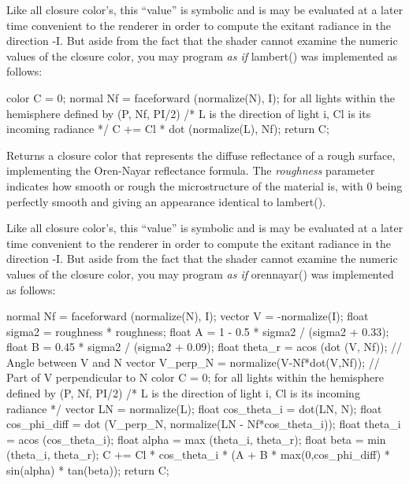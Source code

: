 \documentclass[11pt,letterpaper]{book}
\def\colorclosure{{\cf closure color}\xspace}
\begin{document}
Like all \colorclosure's, this ``value'' is symbolic and is may be
evaluated at a later time convenient to the renderer in order to compute
the exitant radiance in the direction {\cf -I}.  But aside from the
fact that the shader cannot examine the numeric values of the
\colorclosure, you may program \emph{as if} {\cf lambert()} was
implemented as follows:

\begin{code}
    color C = 0;
    normal Nf = faceforward (normalize(N), I);
    for all lights within the hemisphere defined by (P, Nf, PI/2) {
        /* L is the direction of light i, Cl is its incoming radiance */
        C += Cl * dot (normalize(L), Nf);
    }
    return C;
\end{code}
\apiend

\apiitem{\colorclosure\ {\ce orennayar} (float roughness)}

Returns a \colorclosure that represents the diffuse reflectance of a
rough surface, implementing the Oren-Nayar reflectance formula.  The
\emph{roughness} parameter indicates how smooth or rough the
microstructure of the material is, with 0 being perfectly smooth and
giving an appearance identical to {\cf lambert()}.

Like all \colorclosure's, this ``value'' is symbolic and is may be
evaluated at a later time convenient to the renderer in order to compute
the exitant radiance in the direction {\cf -I}.  But aside from the
fact that the shader cannot examine the numeric values of the
\colorclosure, you may program \emph{as if} {\cf orennayar()} was
implemented as follows:

\begin{code}
    normal Nf = faceforward (normalize(N), I);
    vector V = -normalize(I);
    float sigma2 = roughness * roughness;
    float A = 1 - 0.5 * sigma2 / (sigma2 + 0.33);
    float B = 0.45 * sigma2 / (sigma2 + 0.09);
    float  theta_r = acos (dot (V, Nf));         // Angle between V and N
    vector V_perp_N = normalize(V-Nf*dot(V,Nf)); // Part of V perpendicular to N
    color C = 0;
    for all lights within the hemisphere defined by (P, Nf, PI/2) {
        /* L is the direction of light i, Cl is its incoming radiance */
        vector LN = normalize(L);
        float cos_theta_i = dot(LN, N);
        float cos_phi_diff = dot (V_perp_N, normalize(LN - Nf*cos_theta_i));
        float theta_i = acos (cos_theta_i);
        float alpha = max (theta_i, theta_r);
        float beta = min (theta_i, theta_r);
        C += Cl * cos_theta_i * 
                (A + B * max(0,cos_phi_diff) * sin(alpha) * tan(beta));
    }
    return C;
\end{code}
\end{document}
